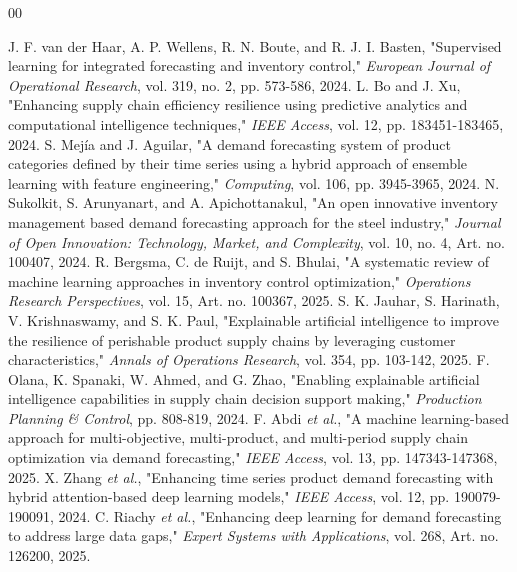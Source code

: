 \documentclass[9pt,conference]{IEEEtran}
\providecommand{\syscite}[1]{}
\begin{document}
\begin{thebibliography}{00}
\scriptsize
\setlength{\itemsep}{0pt}

 J. F. van der Haar, A. P. Wellens, R. N. Boute, and R. J. I. Basten, "Supervised learning for integrated forecasting and inventory control," \textit{European Journal of Operational Research}, vol. 319, no. 2, pp. 573-586, 2024. \syscite{[cite: 1]}
 L. Bo and J. Xu, "Enhancing supply chain efficiency resilience using predictive analytics and computational intelligence techniques," \textit{IEEE Access}, vol. 12, pp. 183451-183465, 2024. \syscite{[cite: 1]}
 S. Mejía and J. Aguilar, "A demand forecasting system of product categories defined by their time series using a hybrid approach of ensemble learning with feature engineering," \textit{Computing}, vol. 106, pp. 3945-3965, 2024. \syscite{[cite: 1]}
 N. Sukolkit, S. Arunyanart, and A. Apichottanakul, "An open innovative inventory management based demand forecasting approach for the steel industry," \textit{Journal of Open Innovation: Technology, Market, and Complexity}, vol. 10, no. 4, Art. no. 100407, 2024. \syscite{[cite: 1]}
 R. Bergsma, C. de Ruijt, and S. Bhulai, "A systematic review of machine learning approaches in inventory control optimization," \textit{Operations Research Perspectives}, vol. 15, Art. no. 100367, 2025. \syscite{[cite: 1]}
 S. K. Jauhar, S. Harinath, V. Krishnaswamy, and S. K. Paul, "Explainable artificial intelligence to improve the resilience of perishable product supply chains by leveraging customer characteristics," \textit{Annals of Operations Research}, vol. 354, pp. 103-142, 2025. \syscite{[cite: 1]}
 F. Olana, K. Spanaki, W. Ahmed, and G. Zhao, "Enabling explainable artificial intelligence capabilities in supply chain decision support making," \textit{Production Planning \& Control}, pp. 808-819, 2024. \syscite{[cite: 1]}
 F. Abdi \textit{et al.}, "A machine learning-based approach for multi-objective, multi-product, and multi-period supply chain optimization via demand forecasting," \textit{IEEE Access}, vol. 13, pp. 147343-147368, 2025. \syscite{[cite: 1]}
 X. Zhang \textit{et al.}, "Enhancing time series product demand forecasting with hybrid attention-based deep learning models," \textit{IEEE Access}, vol. 12, pp. 190079-190091, 2024. \syscite{[cite: 1]}
 C. Riachy \textit{et al.}, "Enhancing deep learning for demand forecasting to address large data gaps," \textit{Expert Systems with Applications}, vol. 268, Art. no. 126200, 2025. \syscite{[cite: 1]}

\end{thebibliography}
\end{document}
